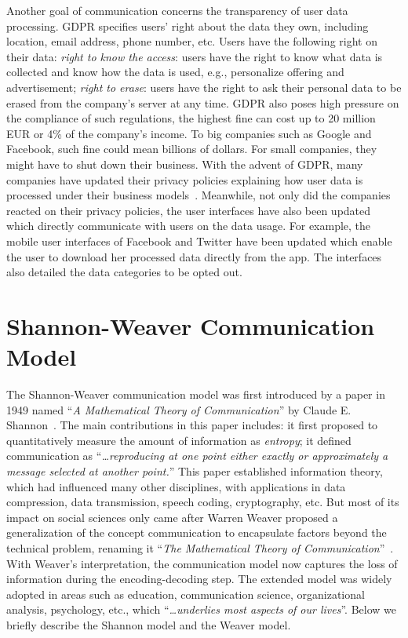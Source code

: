 Another goal of communication concerns the transparency of user data processing. GDPR specifies users' right about the data they own, including location, email address, phone number, etc. Users have the following right on their data: \textit{right to know the access}: users have the right to know what data is collected and know how the data is used, e.g., personalize offering and advertisement; \textit{right to erase}: users have the right to ask their personal data to be erased from the company's server at any time. GDPR also poses high pressure on the compliance of such regulations, the highest fine can cost up to 20 million EUR or 4\% of the company's income. To big companies such as Google and Facebook, such fine could mean billions of dollars. For small companies, they might have to shut down their business. With the advent of GDPR, many companies have updated their privacy policies explaining how user data is processed under their business models~\cite{degeling2018we}. Meanwhile, not only did the companies reacted on their privacy policies, the user interfaces have also been updated which directly communicate with users on the data usage. For example, the mobile user interfaces of Facebook and Twitter have been updated which enable the user to download her processed data directly from the app. The interfaces also detailed the data categories to be opted out. 

\section{Shannon-Weaver Communication Model}

The Shannon-Weaver communication model was first introduced by a paper in 1949 named ``\textit{A Mathematical Theory of Communication}'' by Claude E. Shannon~\cite{shannon1948mathematical}. The main contributions in this paper includes: it first proposed to quantitatively measure the amount of information as \textit{entropy}; it defined communication as ``\textit{\ldots reproducing at one point either exactly or approximately a message selected at another point.}'' This paper established information theory, which had influenced many other disciplines, with applications in data compression, data transmission, speech coding, cryptography, etc. But most of its impact on social sciences only came after Warren Weaver proposed a generalization of the concept communication to encapsulate factors beyond the technical problem, renaming it ``\textit{The Mathematical Theory of Communication}''~\cite{shannon1951mathematical}. With Weaver's interpretation, the communication model now captures the loss of information during the encoding-decoding step. The extended model was widely adopted in areas such as education, communication science, organizational analysis, psychology, etc., which ``\textit{\ldots underlies most aspects of our lives}''. Below we briefly describe the Shannon model and the Weaver model. 

